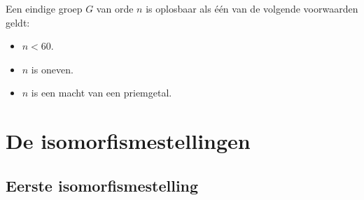 \documentclass[main.tex]{subfiles}
\begin{document}
\begin{st}
  Een eindige groep $G$ van orde $n$ is oplosbaar als \'e\'en van de volgende voorwaarden geldt:
  \begin{itemize}
  \item $n < 60$.
  \item $n$ is oneven.
  \item $n$ is een macht van een priemgetal.
  \end{itemize}
  \zb 
\end{st}

\section{De isomorfismestellingen}
\label{sec:isomorfismestellingen}

\subsection{Eerste isomorfismestelling}
\end{document}
